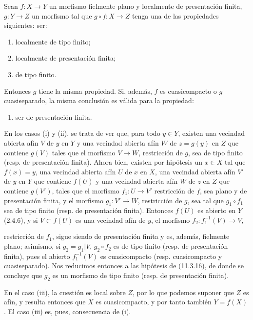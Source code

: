 \begin{lemma}[17.7.5]
\label{IV.17.7.5}
Sean $f:X\to Y$ un morfismo fielmente plano y localmente de presentación finita, $g:Y\to Z$ un morfismo tal que $g\circ f:X\to Z$ tenga una de las propiedades siguientes: ser:
\begin{enumerate}
  \item[\textup{(i)}] localmente de tipo finito;
  \item[\textup{(ii)}] localmente de presentación finita;
  \item[\textup{(iii)}] de tipo finito.
\end{enumerate}
Entonces $g$ tiene la misma propiedad. Si, además, $f$ es cuasicompacto o $g$ cuasiseparado, la misma conclusión es válida para la propiedad:
\begin{enumerate}
  \item[\textup{(iv)}] ser de presentación finita.
\end{enumerate}
\end{lemma}

En los casos (i) y (ii), se trata de ver que, para todo $y\in Y$, existen una vecindad abierta afín $V$ de $y$ en $Y$ y una vecindad abierta afín $W$ de $z=g(y)$ en $Z$ que contiene $g(V)$ tales que el morfismo $V\to W$, restricción de $g$, sea de tipo finito (resp. de presentación finita). Ahora bien, existen por hipótesis un $x\in X$ tal que $f(x)=y$, una vecindad abierta afín $U$ de $x$ en $X$, una vecindad abierta afín $V'$ de $y$ en $Y$ que contiene $f(U)$ y una vecindad abierta afín $W$ de $z$ en $Z$ que contiene $g(V')$, tales que el morfismo $f_1:U\to V'$ restricción de $f$, sea plano y de presentación finita, y el morfismo $g_1:V'\to W$, restricción de $g$, sea tal que $g_1\circ f_1$ sea de tipo finito (resp. de presentación finita). Entonces $f(U)$ es abierto en $Y$ (2.4.6), y si $V\subset f(U)$ es una vecindad afín de $y$, el morfismo $f_2:f_1^{-1}(V)\to V$,


restricción de $f_1$, sigue siendo de presentación finita y es, además, fielmente plano; asimismo, si $g_2=g_1|V$, $g_2\circ f_2$ es de tipo finito (resp. de presentación finita), pues el abierto $f_1^{-1}(V)$ es cuasicompacto (resp. cuasicompacto y cuasiseparado). Nos reducimos entonces a las hipótesis de (11.3.16), de donde se concluye que $g_2$ es un morfismo de tipo finito (resp. de presentación finita).

En el caso (iii), la cuestión es local sobre $Z$, por lo que podemos suponer que $Z$ es afín, y resulta entonces que $X$ es cuasicompacto, y por tanto también $Y=f(X)$. El caso (iii) es, pues, consecuencia de (i).

